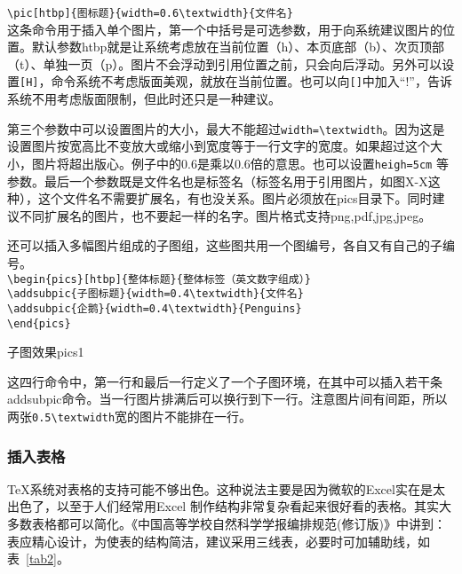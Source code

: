\verb|\pic[htbp]{图标题}{width=0.6\textwidth}{文件名}|\\
这条命令用于插入单个图片，第一个中括号是可选参数，用于向系统建议图片的位置。默认参数htbp就是让系统考虑放在当前位置（h）、本页底部（b）、次页顶部（t）、单独一页（p）。图片不会浮动到引用位置之前，只会向后浮动。另外可以设置\verb|[H]|，命令系统不考虑版面美观，就放在当前位置。也可以向\verb|[]|中加入“!”，告诉系统不用考虑版面限制，但此时还只是一种建议。

第三个参数中可以设置图片的大小，最大不能超过\verb|width=\textwidth|。因为这是设置图片按宽高比不变放大或缩小到宽度等于一行文字的宽度。如果超过这个大小，图片将超出版心。例子中的0.6是乘以0.6倍的意思。也可以设置\verb|heigh=5cm| 等参数。最后一个参数既是文件名也是标签名（标签名用于引用图片，如图X-X这种），这个文件名不需要扩展名，有也没关系。图片必须放在pics目录下。同时建议不同扩展名的图片，也不要起一样的名字。图片格式支持png,pdf,jpg,jpeg。

还可以插入多幅图片组成的子图组，这些图共用一个图编号，各自又有自己的子编号。\\
\verb|\begin{pics}[htbp]{整体标题}{整体标签（英文数字组成）}|\\
\verb|\addsubpic{子图标题}{width=0.4\textwidth}{文件名}|\\
\verb|\addsubpic{企鹅}{width=0.4\textwidth}{Penguins}|\\
\verb|\end{pics}|\\
\begin{pics}[htbp]{子图效果}{pics1}
\end{pics}
这四行命令中，第一行和最后一行定义了一个子图环境，在其中可以插入若干条addsubpic命令。当一行图片排满后可以换行到下一行。注意图片间有间距，所以两张\verb|0.5\textwidth|宽的图片不能排在一行。\par
\subsubsection{插入表格}
\TeX 系统对表格的支持可能不够出色。这种说法主要是因为微软的Excel实在是太出色了，以至于人们经常用Excel 制作结构非常复杂看起来很好看的表格。其实大多数表格都可以简化。《中国高等学校自然科学学报编排规范(修订版)》中讲到：表应精心设计，为使表的结构简洁，建议采用三线表，必要时可加辅助线，如表~\ref{tab2}。


